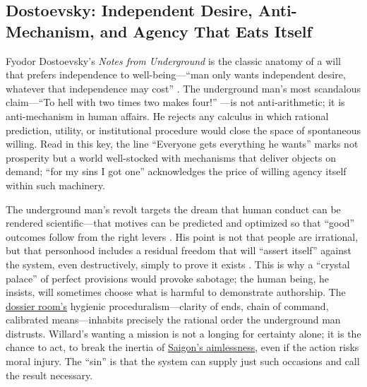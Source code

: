 \subsection*{Dostoevsky: Independent Desire, Anti-Mechanism, and Agency That Eats Itself}
\label{ssec:iii-dostoevsky}
Fyodor Dostoevsky's \emph{Notes from Underground} is the classic anatomy of a will that prefers
independence to well-being—``man only wants independent desire, whatever that independence may
cost'' \parencite[p.~131]{DostoevskyNFU1994}. The underground man's most scandalous claim—``To
hell with two times two makes four!'' \parencite[p.~129]{DostoevskyNFU1994}—is not
anti-arithmetic; it is anti-mechanism in human affairs. He rejects any calculus in which
rational prediction, utility, or institutional procedure would close the space of spontaneous
willing. Read in this key, the line ``Everyone gets everything he wants'' marks not prosperity
but a world well-stocked with mechanisms that deliver objects on demand; ``for my sins I got
one'' acknowledges the price of willing agency itself within such machinery.

The underground man's revolt targets the dream that human conduct can be rendered scientific—that
motives can be predicted and optimized so that ``good'' outcomes follow from the right levers
\parencite[pp.~120--132]{DostoevskyNFU1994}. His point is not that people are irrational, but
that personhood includes a residual freedom that will ``assert itself'' against the system,
even destructively, simply to prove it exists \parencite[pp.~129--132]{DostoevskyNFU1994}.
This is why a ``crystal palace'' of perfect provisions would provoke sabotage; the human being,
he insists, will sometimes choose what is harmful to demonstrate authorship. The
\hyperref[scene:briefing]{dossier room's} hygienic proceduralism—clarity of ends, chain of
command, calibrated means—inhabits precisely the rational order the underground man distrusts.
Willard's wanting a mission is not a longing for certainty alone; it is the chance to act, to
break the inertia of \hyperref[scene:saigon-opening]{Saigon's aimlessness}, even if the action
risks moral injury. The ``sin''
is that the system can supply just such occasions and call the result necessary.

